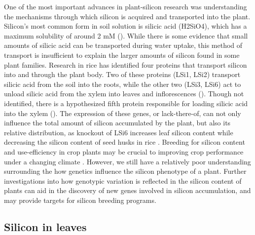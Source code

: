 \documentclass[12pt, letterpaper, ]{article}
\begin{document}
One of the most important advances in plant-silicon research was understanding the mechanisms through which silicon is acquired and transported into the plant. Silicon’s most common form in soil solution is silicic acid (H2SiO4), which has a maximum solubility of around 2 mM (\cite{haynes_contemporary_2014}). While there is some evidence that small amounts of silicic acid can be transported during water uptake, this method of transport is insufficient to explain the larger amounts of silicon found in some plant families. Research in rice has identified four proteins that transport silicon into and through the plant body. Two of these proteins (LSi1, LSi2) transport silicic acid from the soil into the roots, while the other two (LSi3, LSi6) act to unload silicic acid from the xylem into leaves and inflorescences (\cite{yamaji_orchestration_2015}). Though not identified, there is a hypothesized fifth protein responsible for loading silicic acid into the xylem (\cite{farooq_silicon_2015}). The expression of these genes, or lack-there-of, can not only influence the total amount of silicon accumulated by the plant, but also its relative distribution, as knockout of LSi6 increases leaf silicon content while decreasing the silicon content of seed husks in rice \cite{yamaji_transporter_2008}. Breeding for silicon content and use-efficiency in crop plants may be crucial to improving crop performance under a changing climate \cite{christian_breeding_2022}. However, we still have a relatively poor understanding surrounding the how genetics influence the silicon phenotype of a plant. Further investigations into how genotypic variation is reflected in the silicon content of plants can aid in the discovery of new genes involved in silicon accumulation, and may provide targets for silicon breeding programs. 

\subsection{Silicon in leaves}	
\end{document}
